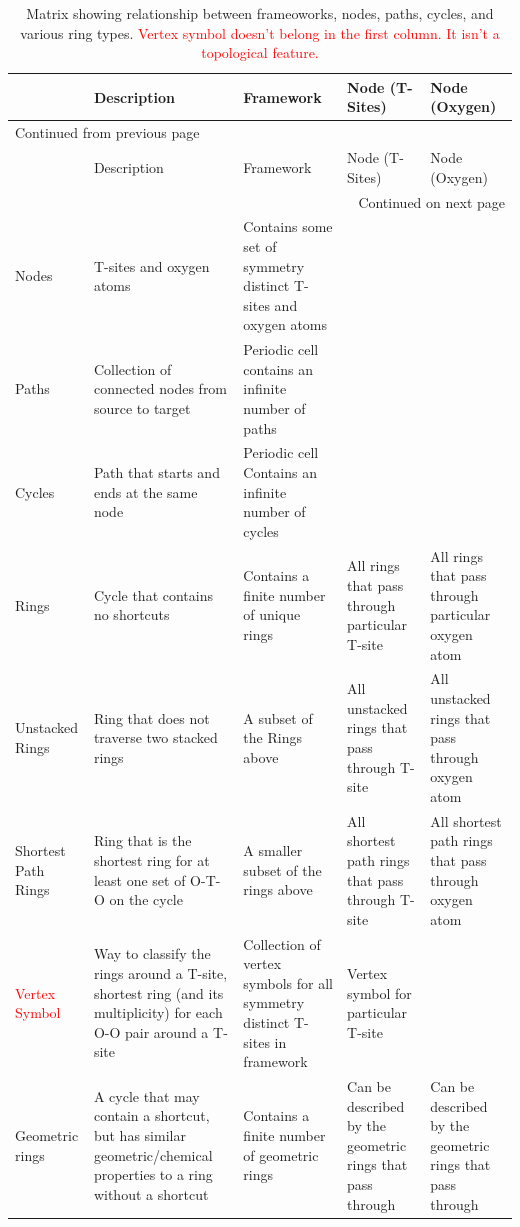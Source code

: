 \documentclass[11pt]{article}
\newcommand{\red}[1]{\textcolor{red}{#1}}
\begin{document}
\begin{longtable}{l p{2.7cm} p{2.7cm} p{2.7cm} p{2.7cm}}
\caption{Matrix showing relationship between frameoworks, nodes, paths, cycles, and various ring types. \red{Vertex symbol doesn't belong in the first column. It isn't a topological feature.} \label{tab:ring-def}}
\\
 & Description & Framework & Node (T-Sites) & Node (Oxygen)\\
\hline
\endfirsthead
\multicolumn{5}{l}{Continued from previous page} \\
\hline

 & Description & Framework & Node (T-Sites) & Node (Oxygen) \\

\hline
\endhead
\hline\multicolumn{5}{r}{Continued on next page} \\
\endfoot
\endlastfoot
\hline
Nodes & T-sites and oxygen atoms & Contains some set of symmetry distinct T-sites and oxygen atoms &  & \\
Paths & Collection of connected nodes from source to target & Periodic cell contains an infinite number of paths &  & \\
Cycles & Path that starts and ends at the same node & Periodic cell Contains an infinite number of cycles &  & \\
Rings & Cycle that contains no shortcuts & Contains a finite number of unique rings & All rings that pass through particular T-site & All rings that pass through particular oxygen atom\\
Unstacked Rings & Ring that does not traverse two stacked rings & A subset of the Rings above & All unstacked rings that pass through T-site & All unstacked rings that pass through oxygen atom\\
Shortest Path Rings & Ring that is the shortest ring for at least one set of O-T-O on the cycle & A smaller subset of the rings above & All shortest path rings that pass through T-site & All shortest path rings that pass through oxygen atom\\
\red{Vertex Symbol} & Way to classify the rings around a T-site, shortest ring (and its multiplicity) for each O-O pair around a T-site & Collection of vertex symbols for all symmetry distinct T-sites in framework & Vertex symbol for particular T-site & \\
Geometric rings & A cycle that may contain a shortcut, but has similar geometric/chemical properties to a ring without a shortcut & Contains a finite number of geometric rings & Can be described by the geometric rings that pass through & Can be described by the geometric rings that pass through\\
\end{longtable}
\end{document}
